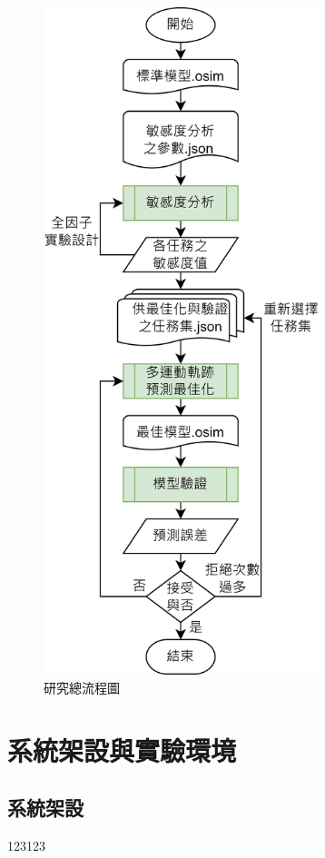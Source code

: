 \bigskip
\begin{figure}[!ht]
	\centering
	\includegraphics[width=8cm]{figure/ch3_flowchart_All.png}
    \caption[研究總流程圖]{研究總流程圖}
    \label{ch3_flowchart_All}
\end{figure}

\clearpage

\section{系統架設與實驗環境}

\subsection{系統架設}
123123
